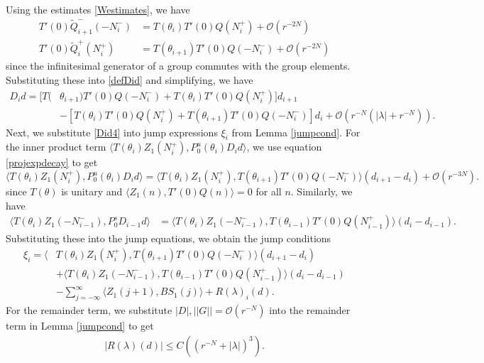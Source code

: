 \documentclass[12pt]{article}
\begin{document}
Using the estimates \eqref{Westimates}, we have
\begin{align*}
T'(0) \tilde{Q}_{i+1}^-(-N_i^-) &= T(\theta_i) T'(0) Q(N_i^+) + \mathcal{O}(r^{-2N}) \\
T'(0) \tilde{Q}_i^+(N_i^+) &= T(\theta_{i+1}) T'(0) Q(-N_i^-) + \mathcal{O}(r^{-2N})
\end{align*}
since the infinitesimal generator of a group commutes with the group elements. Substituting these into \eqref{defDid} and simplifying, we have
\begin{equation}\label{Did4}
\begin{aligned}
D_i d = [ T(&\theta_{i+1}) T'(0)Q(-N_i^-) + T(\theta_i) T'(0)Q(N_i^+) ] d_{i+1} \\
&- [ T(\theta_i) T'(0)Q(N_i^+) + T(\theta_{i+1}) T'(0)Q(-N_i^-) ] d_i 
+\mathcal{O}(r^{-N}( |\lambda| + r^{-N})).
\end{aligned}
\end{equation}
Next, we substitute \eqref{Did4} into jump expressions $\xi_i$ from Lemma \ref{jumpcond}. For the inner product term $\langle T(\theta_i) Z_1(N_i^+), P_0^u(\theta_i) D_i d \rangle$, we use equation \eqref{projexpdecay} to get
\begin{equation*}
\langle T(\theta_i) Z_1(N_i^+), P_0^u(\theta_i) D_i d \rangle 
= \langle T(\theta_i) Z_1(N_i^+), T(\theta_{i+1}) T'(0)Q(-N_i^-) \rangle (d_{i+1} - d_i)
+ \mathcal{O}(r^{-3N}).
\end{equation*}
since $T(\theta)$ is unitary and $\langle Z_1(n), T'(0)Q(n) \rangle = 0$ for all $n$. Similarly, we have
\begin{align*}
\langle T(\theta_i) Z_1(-N_{i-1}^-), P_0^s D_{i-1} d \rangle 
&= \langle T(\theta_i) Z_1(-N_{i-1}^-), T(\theta_{i-1}) T'(0)Q(N_{i-1}^+) \rangle (d_i - d_{i-1}).
\end{align*}
Substituting these into the jump equations, we obtain the jump conditions
\begin{align*}
\xi_i = \langle &T(\theta_i) Z_1(N_i^+), T(\theta_{i+1}) T'(0)Q(-N_i^-) \rangle (d_{i+1} - d_i) \\
&+ \langle T(\theta_i) Z_1(-N_{i-1}^-), T(\theta_{i-1}) T'(0)Q(N_{i-1}^+) \rangle (d_i - d_{i-1}) \\
&- \sum_{j = -\infty}^{\infty} \langle Z_1(j+1), B S_1(j)\rangle + R(\lambda)_i(d).
\end{align*}
For the remainder term, we substitute $|D|, ||G|| = \mathcal{O}(r^{-N})$ into the remainder term in Lemma \ref{jumpcond} to get
\begin{align*}
|R(\lambda)(d)| \leq C\left( (r^{-N} + |\lambda|)^3 \right).
\end{align*} 
\end{document}
